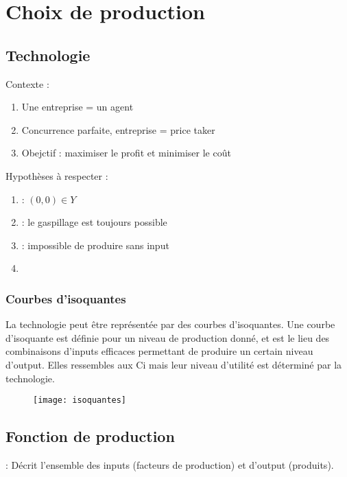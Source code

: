 \section{Choix de production}

\subsection{Technologie}

Contexte :
\begin{enumerate}
\item Une entreprise = un agent
\item Concurrence parfaite, entreprise = price taker
\item Obejctif : maximiser le profit et minimiser le coût
\end{enumerate}

Hypothèses à respecter :
\begin{enumerate}
\item {} : $(0,0) \in Y$
\item {} : le gaspillage est toujours possible
\item {} : impossible de produire sans input
\item {}
\end{enumerate}

\subsubsection{Courbes d'isoquantes}

La technologie peut être représentée par des courbes d'isoquantes. Une courbe d'isoquante est définie pour un niveau de production donné, et est le lieu des combinaisons d'inputs efficaces permettant de produire un certain niveau d'output. Elles ressembles aux Ci mais leur niveau d'utilité est déterminé par la technologie.
\begin{figure}[H]
	\centering
	\texttt{[image: isoquantes]}
\end{figure}

\subsection{Fonction de production}

 : Décrit l'ensemble des inputs (facteurs de production) et d'output (produits).

